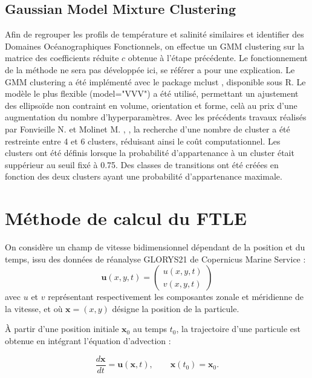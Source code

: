 \documentclass[11pt,a4paper,oneside]{report}
\begin{document}
	\subsection{Gaussian Model Mixture Clustering}
	Afin de regrouper les profils de température et salinité similaires et identifier des Domaines Océanographiques Fonctionnels, on effectue un GMM clustering sur la matrice des coefficients réduite $c$ obtenue à l'étape précédente. Le fonctionnement de la méthode ne sera pas développée ici, se référer a \cite{bishop2006pattern} pour une explication. Le GMM clustering a été implémenté avec le package mclust \cite{scrucca2016mclust}, \cite{fraley2002mclust} disponible sous R. Le modèle le plus flexible (model="VVV") a été utilisé, permettant un ajustement des ellipsoïde non contraint en volume, orientation et forme, celà au prix d'une augmentation du nombre d'hyperparamètres. Avec les précédents travaux réalisés par Fonvieille N. et Molinet M. \cite{fonvieille2024}, \cite{molinetLinkingOceanographic}, la recherche d'une nombre de cluster a été restreinte entre 4 et 6 clusters, réduisant ainsi le coût computationnel. Les clusters ont été définis lorsque la probabilité d'appartenance à un cluster était suppérieur au seuil fixé à 0.75. Des classes de transitions ont été créées en fonction des deux clusters ayant une probabilité d'appartenance maximale. 
	
	\section{Méthode de calcul du FTLE}
	\label{annexe:compute_ftle}
	On considère un champ de vitesse bidimensionnel dépendant de la position et du temps, issu des données de réanalyse GLORYS21 de Copernicus Marine Service :
	\begin{equation}
		\mathbf{u}(x,y,t)
		=
		\begin{pmatrix}
			u(x,y,t)\\
			v(x,y,t)
		\end{pmatrix}
	\end{equation}
	avec $u$ et $v$ représentant respectivement les composantes zonale et méridienne de la vitesse, et où $\mathbf{x}=(x,y)$ désigne la position de la particule.
	
	À partir d'une position initiale $\mathbf{x}_0$ au temps $t_0$, la trajectoire d'une particule est obtenue en intégrant l'équation d'advection :
	
	\begin{equation}
		\frac{d\mathbf{x}}{dt}
		=
		\mathbf{u}(\mathbf{x},t),
		\qquad
		\mathbf{x}(t_0)=\mathbf{x}_0.
	\end{equation}
	
\end{document}
